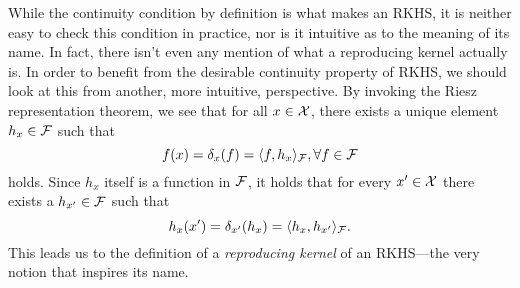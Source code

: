 %
%


While the continuity condition by definition is what makes an RKHS, it is neither easy to check this condition in practice, nor is it intuitive as to the meaning of its name.
In fact, there isn't even any mention of what a reproducing kernel actually is.
In order to benefit from the desirable continuity property of RKHS, we should look at this from another, more intuitive, perspective. 
By invoking the Riesz representation theorem, we see that for all $x\in{\mathcal X}$, there exists a unique element $h_x\in{\mathcal F}$ such that
\[
  f(x) = \delta_x(f) = \langle f,h_x\rangle_{\mathcal F}, \forall f \in {\mathcal F}
\]
holds. 
Since $h_x$ itself is a function in ${\mathcal F}$, it holds that for every $x' \in {\mathcal X}$ there exists a $h_{x'}\in{\mathcal F}$ such that
\[
  h_{x}(x') = \delta_{x'}(h_{x}) = \langle h_x,h_{x'}\rangle_{\mathcal F}.
\]
This leads us to the definition of a \emph{reproducing kernel} of an RKHS---the very notion that inspires its name.

